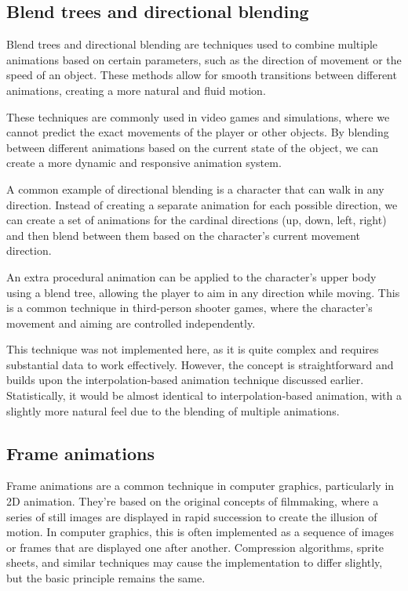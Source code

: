 \pagebreak

\subsection{Blend trees and directional blending}
\label{subsec:blend-trees-directional-blending}

Blend trees and directional blending are techniques used to combine multiple animations based on certain parameters, such as the direction of movement or the speed of an object. These methods allow for smooth transitions between different animations, creating a more natural and fluid motion.

These techniques are commonly used in video games and simulations, where we cannot predict the exact movements of the player or other objects. By blending between different animations based on the current state of the object, we can create a more dynamic and responsive animation system.

A common example of directional blending is a character that can walk in any direction. Instead of creating a separate animation for each possible direction, we can create a set of animations for the cardinal directions (up, down, left, right) and then blend between them based on the character's current movement direction.

An extra procedural animation can be applied to the character's upper body using a blend tree, allowing the player to aim in any direction while moving. This is a common technique in third-person shooter games, where the character's movement and aiming are controlled independently.

This technique was not implemented here, as it is quite complex and requires substantial data to work effectively. However, the concept is straightforward and builds upon the interpolation-based animation technique discussed earlier. Statistically, it would be almost identical to interpolation-based animation, with a slightly more natural feel due to the blending of multiple animations.

\vspace{30pt}

\subsection{Frame animations}
\label{subsec:frame-animations}

Frame animations are a common technique in computer graphics, particularly in 2D animation. They're based on the original concepts of filmmaking, where a series of still images are displayed in rapid succession to create the illusion of motion. In computer graphics, this is often implemented as a sequence of images or frames that are displayed one after another. Compression algorithms, sprite sheets, and similar techniques may cause the implementation to differ slightly, but the basic principle remains the same.

